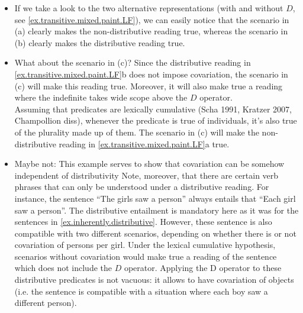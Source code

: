 \documentclass[a4paper]{article}
\newcommand{\addMM}[1]{{\leavevmode\color{red}#1}}
\begin{document}
\begin{itemize}
\item If we take a look to the two alternative representations (with and without $D$, see \ref{ex.transitive.mixed.paint.LF}), we can easily notice that the scenario in (a) clearly makes the non-distributive reading true, whereas the scenario in (b) clearly makes the distributive reading true.

\item What about the scenario in (c)? 
Since the distributive reading in \ref{ex.transitive.mixed.paint.LF}b does not impose covariation, the scenario in (c) will make this reading true. Moreover, it will also make true a reading where the indefinite takes wide scope above the $D$ operator. 
 \\  
Assuming that predicates are lexically cumulative (Scha 1991, Kratzer 2007, Champollion diss), whenever the predicate is true of individuals, it's also true of the plurality made up of them. The scenario in (c) will make the non-distributive reading in \ref{ex.transitive.mixed.paint.LF}a true.

\item \addMM{Maybe not: This example serves to show that covariation can be somehow independent of distributivity} Note, moreover, that there are certain verb phrases that can only be understood under a distributive reading. For instance, the sentence ``The girls saw a person'' always entails that ``Each girl saw a person''. The distributive entailment is mandatory here as it was for the sentences in \ref{ex.inherently.distributive}. However, these sentence is also compatible with two different scenarios, depending on whether there is or not covariation of persons per girl. Under the lexical cumulative hypothesis, scenarios without covariation would make true a reading of the sentence which does not include the $D$ operator. Applying the D operator to these distributive predicates is not vacuous: it allows to have covariation of objects (i.e. the sentence is compatible with a situation where each boy saw a different person). 


\end{itemize}

\end{document}
